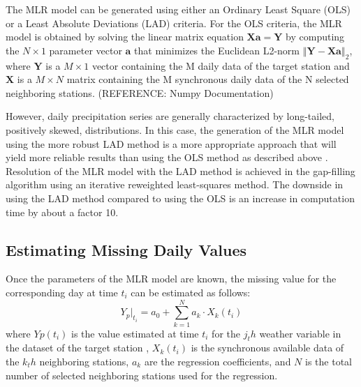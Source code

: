 \documentclass[TechnicalNoteMeteo.tex]{subfiles}
\begin{document}
The MLR model can be generated using either an Ordinary Least Square (OLS) or a Least Absolute Deviations (LAD) criteria. For the OLS criteria, the MLR model is obtained by solving the linear matrix equation $\mathbf{X}\mathbf{a} = \mathbf{Y}$ by computing the $N \times 1$ parameter vector $\mathbf{a}$ that minimizes the Euclidean L2-norm $\left\Vert \mathbf{Y}-\mathbf{X}\mathbf{a} \right\Vert_2$, where $\mathbf{Y}$ is a $M \times 1$ vector containing the M daily data of the target station and $\mathbf{X}$ is a $M \times N$ matrix containing the M synchronous daily data of the N selected neighboring stations. (REFERENCE: Numpy Documentation)

However, daily precipitation series are generally characterized by long-tailed, positively skewed, distributions. In this case, the generation of the MLR model using the more robust LAD method is a more appropriate approach that will yield more reliable results than using the OLS method as described above \cite{menke_geophysical_1989,eischeid_creating_2000}. Resolution of the MLR model with the LAD method is achieved in the gap-filling algorithm using an iterative reweighted least-squares method.  The downside in using the LAD method compared to using the OLS is an increase in computation time by about a factor 10.




\subsection{Estimating Missing Daily Values}

Once the parameters of the MLR model are known, the missing value for the corresponding day at time $t_i$ can be estimated as follows:
%
\begin{equation}
    Y_p\vert_{t_i} = a_0 + \sum_{k=1}^{N} a_k \cdot X_k(t_i)
\end{equation}
%
where $Yp(t_i)$ is the value estimated at time $t_i$ for the $j_th$ weather variable in the dataset of the target station , $X_k(t_i)$ is the synchronous available data of the $k_th$ neighboring stations, $a_k$ are the regression coefficients, and $N$ is the total number of selected neighboring stations used for the regression.
\end{document}
